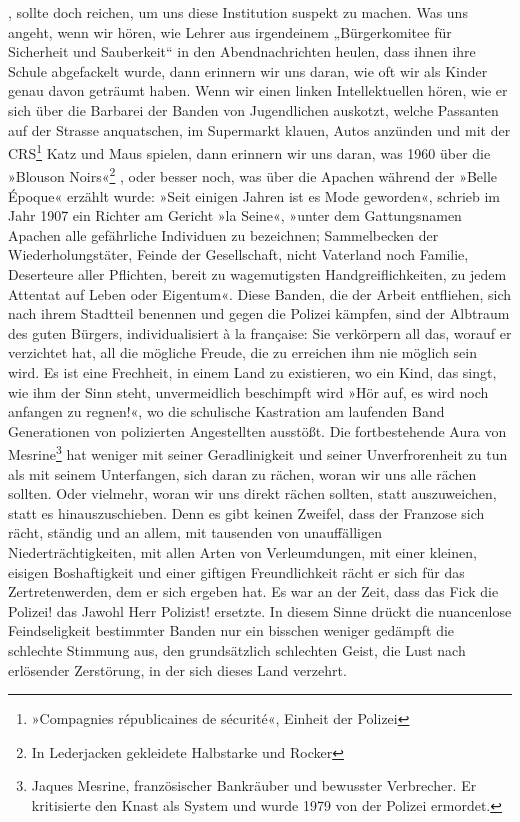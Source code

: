 , sollte doch reichen, um uns diese Institution
suspekt zu machen.
Was uns angeht, wenn wir hören, wie Lehrer aus irgendeinem
„Bürgerkomitee für Sicherheit und Sauberkeit“ in den
Abendnachrichten heulen, dass ihnen ihre Schule abgefackelt wurde,
dann erinnern wir uns daran, wie oft wir als Kinder genau davon
geträumt haben. Wenn wir einen linken Intellektuellen hören, wie er
sich über die Barbarei der Banden von Jugendlichen auskotzt, welche
Passanten auf der Strasse anquatschen, im Supermarkt klauen, Autos
anzünden und mit der CRS\footnote{
»Compagnies républicaines de sécurité«, Einheit der Polizei
}
Katz und Maus spielen, dann erinnern wir
uns daran, was 1960 über die »Blouson Noirs«\footnote{
In Lederjacken gekleidete Halbstarke und Rocker}%
, oder besser noch,
was über die Apachen während der »Belle Époque« erzählt wurde:
»Seit einigen Jahren ist es Mode geworden«, schrieb im Jahr 1907
ein Richter am Gericht »la Seine«, »unter dem Gattungsnamen Apachen
alle gefährliche Individuen zu bezeichnen; Sammelbecken der
Wiederholungstäter, Feinde der Gesellschaft, nicht Vaterland noch
Familie, Deserteure aller Pflichten, bereit zu wagemutigsten
Handgreiflichkeiten, zu jedem Attentat auf Leben oder Eigentum«.
Diese Banden, die der Arbeit entfliehen, sich nach ihrem Stadtteil
benennen und gegen die Polizei kämpfen, sind der Albtraum des guten
Bürgers, individualisiert à la française: Sie verkörpern all das,
worauf er verzichtet hat, all die mögliche Freude, die zu erreichen
ihm nie möglich sein wird. Es ist eine Frechheit, in einem Land zu
existieren, wo ein Kind, das singt, wie ihm der Sinn steht,
unvermeidlich beschimpft wird »Hör auf, es wird noch anfangen zu
regnen!«, wo die schulische Kastration am laufenden Band
Generationen von polizierten Angestellten ausstößt. Die
fortbestehende Aura von Mesrine\footnote{
Jaques Mesrine, französischer Bankräuber und bewusster
Verbrecher. Er kritisierte den Knast als System und wurde 1979 von
der Polizei ermordet.
}
hat weniger mit seiner
Geradlinigkeit und seiner Unverfrorenheit zu tun als mit seinem
Unterfangen, sich daran zu rächen, woran wir uns alle rächen
sollten. Oder vielmehr, woran wir uns direkt rächen sollten, statt
auszuweichen, statt es hinauszuschieben. Denn es gibt keinen
Zweifel, dass der Franzose sich rächt, ständig und an allem, mit
tausenden von unauffälligen Niederträchtigkeiten, mit allen Arten
von Verleumdungen, mit einer kleinen, eisigen Boshaftigkeit und
einer giftigen Freundlichkeit rächt er sich für das
Zertretenwerden, dem er sich ergeben hat. Es war an der Zeit, dass
das Fick die Polizei! das Jawohl Herr Polizist! ersetzte. In diesem
Sinne drückt die nuancenlose Feindseligkeit bestimmter Banden nur
ein bisschen weniger gedämpft die schlechte Stimmung aus, den
grundsätzlich schlechten Geist, die Lust nach erlösender
Zerstörung, in der sich dieses Land verzehrt.

